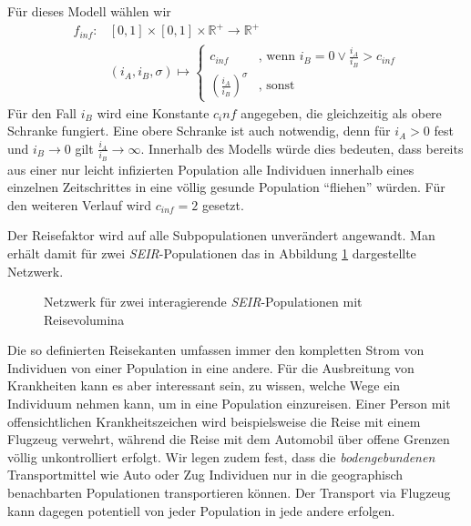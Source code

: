 Für dieses Modell wählen wir
\begin{align}
	f_{inf} :& [0,1]\times [0,1] \times \mathbb{R}^+ \rightarrow  \mathbb{R}^+\\
			 & (i_A,i_B,\sigma)\longmapsto								\begin{cases}c_{inf}&\text{, wenn } i_B = 0 \vee \frac{i_A}{i_B} > c_{inf} \\\left( \frac{i_A}{i_B}\right)^\sigma &\text{, sonst}\end{cases}\nonumber			  
\end{align}
Für den Fall $i_B$ wird eine Konstante $c_inf$ angegeben, die gleichzeitig als obere Schranke fungiert. Eine obere Schranke ist auch notwendig, denn für $i_A >0$ fest und $i_B\rightarrow 0$ gilt $\frac{i_A}{i_B}\rightarrow \infty$. Innerhalb des Modells würde dies bedeuten, dass bereits aus einer nur leicht infizierten Population alle Individuen innerhalb eines einzelnen Zeitschrittes in eine völlig gesunde Population ``fliehen'' würden. Für den weiteren Verlauf wird $c_{inf} = 2$ gesetzt. 

Der Reisefaktor wird auf alle Subpopulationen unverändert angewandt. Man erhält damit für zwei \emph{SEIR}-Populationen das in Abbildung \ref{fig:ssec:multiPop:travelSEIR} dargestellte Netzwerk.
\begin{figure}
\begin{center}
\end{center}
\caption{Netzwerk für zwei interagierende \emph{SEIR}-Populationen mit Reisevolumina}\label{fig:ssec:multiPop:travelSEIR}
\end{figure}
Die so definierten Reisekanten umfassen immer den kompletten Strom von Individuen von einer Population in eine andere. Für die Ausbreitung von Krankheiten kann es aber interessant sein, zu wissen, welche Wege ein Individuum nehmen kann, um in eine Population einzureisen. Einer Person mit offensichtlichen Krankheitszeichen wird beispielsweise die Reise mit einem Flugzeug verwehrt, während die Reise mit dem Automobil über offene Grenzen völlig unkontrolliert erfolgt. Wir legen zudem fest, dass die \emph{bodengebundenen} Transportmittel wie Auto oder Zug Individuen nur in die geographisch benachbarten Populationen transportieren können. Der Transport via Flugzeug kann dagegen potentiell von jeder Population in jede andere erfolgen. 


